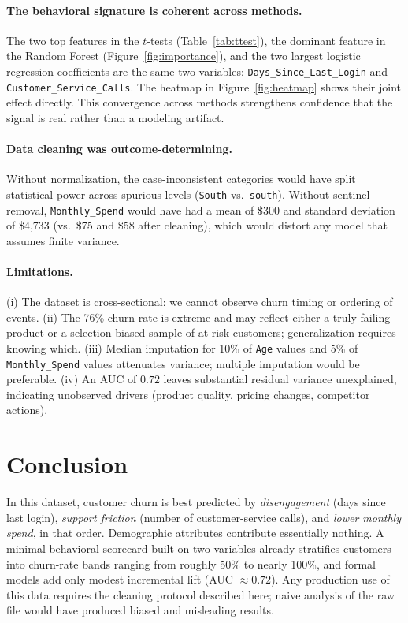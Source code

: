\documentclass[11pt]{article}
\begin{document}
\paragraph{The behavioral signature is coherent across methods.} The two top features in the $t$-tests (Table~\ref{tab:ttest}), the dominant feature in the Random Forest (Figure~\ref{fig:importance}), and the two largest logistic regression coefficients are the same two variables: \texttt{Days\_Since\_Last\_Login} and \texttt{Customer\_Service\_Calls}. The heatmap in Figure~\ref{fig:heatmap} shows their joint effect directly. This convergence across methods strengthens confidence that the signal is real rather than a modeling artifact.

\paragraph{Data cleaning was outcome-determining.} Without normalization, the case-inconsistent categories would have split statistical power across spurious levels (\texttt{South} vs.\ \texttt{south}). Without sentinel removal, \texttt{Monthly\_Spend} would have had a mean of \$300 and standard deviation of \$4{,}733 (vs.\ \$75 and \$58 after cleaning), which would distort any model that assumes finite variance.

\paragraph{Limitations.} (i) The dataset is cross-sectional: we cannot observe churn timing or ordering of events. (ii) The 76\% churn rate is extreme and may reflect either a truly failing product or a selection-biased sample of at-risk customers; generalization requires knowing which. (iii) Median imputation for 10\% of \texttt{Age} values and 5\% of \texttt{Monthly\_Spend} values attenuates variance; multiple imputation would be preferable. (iv) An AUC of $0.72$ leaves substantial residual variance unexplained, indicating unobserved drivers (product quality, pricing changes, competitor actions).

\section{Conclusion}
In this dataset, customer churn is best predicted by \emph{disengagement} (days since last login), \emph{support friction} (number of customer-service calls), and \emph{lower monthly spend}, in that order. Demographic attributes contribute essentially nothing. A minimal behavioral scorecard built on two variables already stratifies customers into churn-rate bands ranging from roughly 50\% to nearly 100\%, and formal models add only modest incremental lift (AUC $\approx 0.72$). Any production use of this data requires the cleaning protocol described here; naive analysis of the raw file would have produced biased and misleading results.
\end{document}
